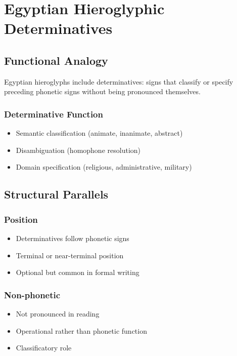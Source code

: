 \section{Egyptian Hieroglyphic Determinatives}

\subsection{Functional Analogy}

Egyptian hieroglyphs include determinatives: signs that classify or specify preceding phonetic signs without being pronounced themselves.

\subsubsection{Determinative Function}
\begin{itemize}
    \item Semantic classification (animate, inanimate, abstract)
    \item Disambiguation (homophone resolution)
    \item Domain specification (religious, administrative, military)
\end{itemize}

\subsection{Structural Parallels}

\subsubsection{Position}
\begin{itemize}
    \item Determinatives follow phonetic signs
    \item Terminal or near-terminal position
    \item Optional but common in formal writing
\end{itemize}

\subsubsection{Non-phonetic}
\begin{itemize}
    \item Not pronounced in reading
    \item Operational rather than phonetic function
    \item Classificatory role
\end{itemize}

